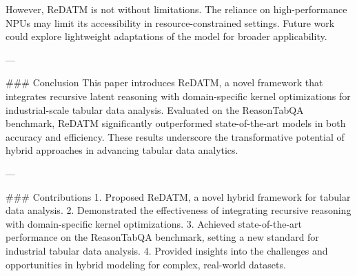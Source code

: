 However, ReDATM is not without limitations. The reliance on high-performance NPUs may limit its accessibility in resource-constrained settings. Future work could explore lightweight adaptations of the model for broader applicability.

---

### Conclusion
This paper introduces ReDATM, a novel framework that integrates recursive latent reasoning with domain-specific kernel optimizations for industrial-scale tabular data analysis. Evaluated on the ReasonTabQA benchmark, ReDATM significantly outperformed state-of-the-art models in both accuracy and efficiency. These results underscore the transformative potential of hybrid approaches in advancing tabular data analytics.

---

### Contributions
1. Proposed ReDATM, a novel hybrid framework for tabular data analysis.
2. Demonstrated the effectiveness of integrating recursive reasoning with domain-specific kernel optimizations.
3. Achieved state-of-the-art performance on the ReasonTabQA benchmark, setting a new standard for industrial tabular data analysis.
4. Provided insights into the challenges and opportunities in hybrid modeling for complex, real-world datasets.